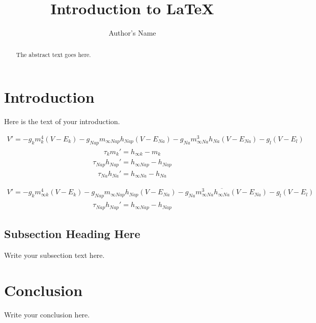 \documentclass[fleqn]{article}
\begin{document}
\title{Introduction to \LaTeX{}}
\author{Author's Name}

\maketitle

\begin{abstract}
The abstract text goes here.
\end{abstract}

\section{Introduction}
Here is the text of your introduction.

\begin{align}
    V' = -g_{k}m_{k}^4 ( V - E_{k} ) - g_{Nap}m_{\infty Nap}h_{Nap} ( V - E_{Na} ) - g_{Na}m_{\infty Na}^3h_{Na} ( V - E_{Na} ) - g_{l} ( V - E_{l} ) \nonumber
\end{align}
\begin{align}
    \tau_{k}m_{k}' = h_{\infty k} - m_{k} \nonumber
\end{align}
\begin{align}
    \tau_{Nap}h_{Nap}' = h_{\infty Nap} - h_{Nap} \nonumber
\end{align}
\begin{align}
    \tau_{Na}h_{Na}' = h_{\infty Na} - h_{Na} \nonumber
\end{align}


\begin{align}
    V' = -g_{k}m_{\infty k}^4 ( V - E_{k} ) - g_{Nap}m_{\infty Nap}h_{Nap} ( V - E_{Na} ) - g_{Na}m_{\infty Na}^3\overline{h_{\infty Na}} ( V - E_{Na} ) - g_{l} ( V - E_{l} ) \nonumber
\end{align}
\begin{align}
    \tau_{Nap}h_{Nap}' = h_{\infty Nap} - h_{Nap} \nonumber
\end{align}

\subsection{Subsection Heading Here}
Write your subsection text here.

\section{Conclusion}
Write your conclusion here.
\end{document}
